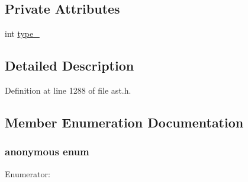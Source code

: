 \subsection*{Private Attributes}
\begin{DoxyCompactItemize}
\item 
int \hyperlink{classmocha_1_1_property_afdca8908f121ab969e2dd3d5a427da6b}{type\_\-}
\end{DoxyCompactItemize}


\subsection{Detailed Description}


Definition at line 1288 of file ast.h.



\subsection{Member Enumeration Documentation}
\hypertarget{classmocha_1_1_property_a01fca1d5284de1e187b79f0760573eae}{
\subsubsection[{"@6}]{\setlength{\rightskip}{0pt plus 5cm}anonymous enum}}
\label{classmocha_1_1_property_a01fca1d5284de1e187b79f0760573eae}
\begin{Desc}
\item[Enumerator: ]\par
\begin{description}
\item[{\em 
\hypertarget{classmocha_1_1_property_a01fca1d5284de1e187b79f0760573eaea75981815d6cef7558c29e66f900a826f}{
kDot}
\label{classmocha_1_1_property_a01fca1d5284de1e187b79f0760573eaea75981815d6cef7558c29e66f900a826f}
}]\item[{\em 
\hypertarget{classmocha_1_1_property_a01fca1d5284de1e187b79f0760573eaea95807b66fe9d1ad15a36d2fe36575b7f}{
kBracket}
\label{classmocha_1_1_property_a01fca1d5284de1e187b79f0760573eaea95807b66fe9d1ad15a36d2fe36575b7f}
}]\item[{\em 
\hypertarget{classmocha_1_1_property_a01fca1d5284de1e187b79f0760573eaea4bfd95a31cf96b1636bcc4b7725c7926}{
kExtend}
\label{classmocha_1_1_property_a01fca1d5284de1e187b79f0760573eaea4bfd95a31cf96b1636bcc4b7725c7926}
}]\item[{\em 
\hypertarget{classmocha_1_1_property_a01fca1d5284de1e187b79f0760573eaea471080bd9724c1fb1dcdb676e3fcf25a}{
kNew}
\label{classmocha_1_1_property_a01fca1d5284de1e187b79f0760573eaea471080bd9724c1fb1dcdb676e3fcf25a}
}]\end{description}
\end{Desc}



